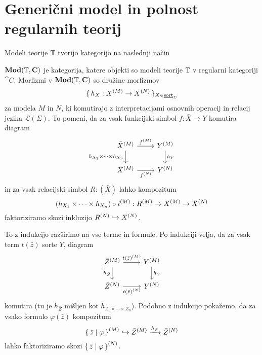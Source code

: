 \documentclass[../kategoricna_logika.tex]{subfiles}
\begin{document}
  \section{Generični model in polnost regularnih teorij}
  Modeli teorije $\T$ tvorijo kategorijo na naslednji način
  \begin{definicija}
    $\Mod(\T, \cat{C})$ je kategorija, katere objekti so modeli
    teorije $\T$ v regularni kategoriji $\cat{C}$. Morfizmi v
    $\Mod(\T, \cat{C})$ so družine morfizmov
    $$\set{h_X : \interp{X} \to \interp[N]{X}}_{X \in \underline{\mathrm{sort}}_\Sigma}$$
    za modela $M$ in $N$, ki komutirajo z interpretacijami osnovnih operacij in relacij jezika
    $\mathcal{L}(\Sigma)$.
    To pomeni, da za vsak funkcijski simbol $f : \bar{X} \to Y$ komutira diagram
    \begin{equation*}
  \begin{tikzcd}
    \interp{\bar{X}} \ar[d, "h_{X_1} \times \cdots \times h_{X_n}"'] \ar[r, "\interp{f}"] & \interp{Y} \ar[d, "h_Y"]\\
    \interp{\bar{X}} \ar[r, "{\interp[N]{f}}"'] & \interp[N]{Y}
  \end{tikzcd}
\end{equation*}
in za vsak relacijski simbol $R : (\bar{X})$ lahko kompozitum
$$(h_{X_1} \times \cdots \times h_{X_n}) \circ \interp{i} : \interp{R} \to \interp{\bar{X}} \to \interp[N]{\bar{X}}$$
faktoriziramo skozi inkluzijo $\interp[N]{R} \hookrightarrow \interp[N]{X}$.
\end{definicija}
To z indukcijo razširimo na vse terme in formule. Po indukciji
velja, da za vsak term $t(\bar{z})$ sorte $Y$, diagram
\begin{equation*}
  \begin{tikzcd}
    \interp{\bar{Z}} \ar[d, "h_{\bar{Z}}"'] \ar[r, "{t(\bar{z})^{(M)}}"] & \interp{Y} \ar[d, "h_Y"] \\
    \interp[N]{\bar{Z}} \ar[r, "{\interp[N]{t(\bar{z})}}"'] &
    \interp[N]{Y}
  \end{tikzcd}
\end{equation*}
komutira (tu je $h_{\bar{Z}}$ mišljen kot
$h_{Z_1 \times \cdots \times Z_n}$).  Podobno z indukcijo pokažemo, da
za vsako formulo $\varphi(\bar{z})$ kompozitum
$$\interp{\set{\bar{z}  \mid  \varphi}} \hookrightarrow \interp{\bar{Z}} \xrightarrow{h_{\bar{Z}}} \interp[N]{\bar{Z}}$$
lahko faktoriziramo skozi
$\interp[N]{\set{\bar{z}  \mid  \varphi}}$.
\end{document}
